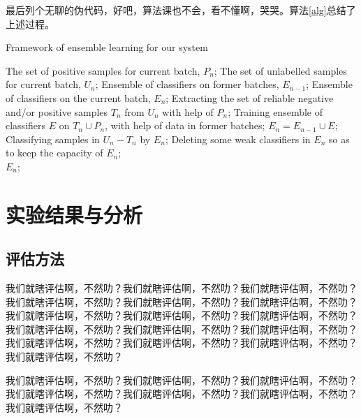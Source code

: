 \documentclass[a4paper,12pt]{book} %
\begin{document}
最后列个无聊的伪代码，好吧，算法课也不会，看不懂啊，哭哭。算法\ref{alg}总结了上述过程。

\begin{algorithm}[htb]
    \caption{Framework of ensemble learning for our system}
    \label{alg}
    \begin{algorithmic}[1]
        \Require  
            The set of positive samples for current batch, $P_n$; The set of unlabelled samples for current batch, $U_n$; Ensemble of classifiers on former batches, $E_{n-1}$;  
        \Ensure  
            Ensemble of classifiers on the current batch, $E_n$;  
        \State Extracting the set of reliable negative and/or positive samples $T_n$ from $U_n$ with help of $P_n$;  
        \label{code:fram:extract}
        \State Training ensemble of classifiers $E$ on $T_n \cup P_n$, with help of data in former batches;  
        \label{code:fram:trainbase}  
        \State $E_n=E_{n-1} \cup E$;  
        \label{code:fram:add}  
        \State Classifying samples in $U_n-T_n$ by $E_n$;  
        \label{code:fram:classify}  
        \State Deleting some weak classifiers in $E_n$ so as to keep the capacity of $E_n$;  
        \label{code:fram:select} \\  
        \Return $E_n$;  
    \end{algorithmic}
\end{algorithm}

\clearpage{\pagestyle{empty}\cleardoublepage}


\chapter{实验结果与分析}

\section{评估方法}

我们就瞎评估啊，不然叻？我们就瞎评估啊，不然叻？我们就瞎评估啊，不然叻？我们就瞎评估啊，不然叻？我们就瞎评估啊，不然叻？我们就瞎评估啊，不然叻？我们就瞎评估啊，不然叻？我们就瞎评估啊，不然叻？我们就瞎评估啊，不然叻？我们就瞎评估啊，不然叻？我们就瞎评估啊，不然叻？我们就瞎评估啊，不然叻？我们就瞎评估啊，不然叻？我们就瞎评估啊，不然叻？我们就瞎评估啊，不然叻？我们就瞎评估啊，不然叻？

我们就瞎评估啊，不然叻？我们就瞎评估啊，不然叻？我们就瞎评估啊，不然叻？我们就瞎评估啊，不然叻？我们就瞎评估啊，不然叻？我们就瞎评估啊，不然叻？我们就瞎评估啊，不然叻？
\end{document}
